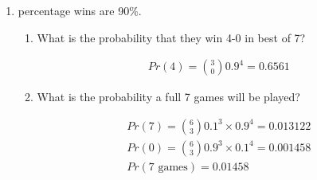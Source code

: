 \documentclass{report}
\begin{document}
\begin{itemize}
\begin{enumerate}
            \item percentage wins are 90\%.
                \begin{enumerate}
                    \item What is the probability that they win
                        4-0 in best of 7?

                        \begin{gather}
                            Pr(4) = \binom{3}{0}0.9^{4} = 0.6561 
                        \end{gather}

                    \item What is the probability a full 7 games
                        will be played?

                        \begin{gather}
                            Pr(7) = \binom{6}{3} 0.1^3 \times 0.9^4 = 0.013122\\
                            Pr(0) = \binom{6}{3} 0.9^3 \times 0.1^4 = 0.001458\\
                            Pr(\textrm{7 games}) = 0.01458
                        \end{gather}
                \end{enumerate}
        \end{enumerate}
\end{itemize}
\end{document}
